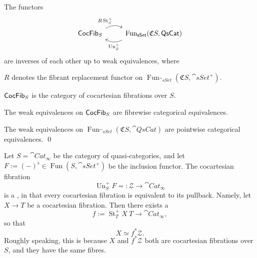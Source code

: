 \begin{corollary}
    The functors 
    \[\begin{tikzcd}
        \smash{\cat{CocFib}_{\/S}}\vphantom{1_1}\ar[r,bend left,start anchor=north east,end anchor=north west,"R\operatorname{St}_S^+"] &
        \operatorname{Fun}_{\cat{sSet}}(\mathfrak CS,\cat{QsCat})\ar[l,bend left,start anchor=south west,end anchor=south east,"\operatorname{Un}_S^+"]
    \end{tikzcd}\]
    are inverses of each other up to weak equivalences, where 
    \begin{itms}
        \item $R$ denotes the fibrant replacement functor on
        $\operatorname{Fun}_{\cat{sSet}}(\mathfrak CS,\cat{sSet}^+)$.
        \item $\mathsf{CocFib}_{\/S}$ is the category of cocartesian fibrations over $S$.
        \item The weak equivalences on $\mathsf{CocFib}_{\/S}$
        are fibrewise categorical equivalences.
        \item The weak equivalences on 
        $\operatorname{Fun}_{\cat{sSet}}(\mathfrak CS,\cat{QsCat})$
        are pointwise categorical equivalences. \qed
    \end{itms}
\end{corollary}

\begin{example}
    Let $S=\cat{Cat}_\infty$ be the category of quasi-categories,
    and let $F:=(-)^\flat\in\operatorname{Fun}(S,\cat{sSet}^+)$
    be the inclusion functor.
    The cocartesian fibration 
    \[ \operatorname{Un}_S^+F=:\mathscr Z\to\cat{Cat}_\infty \]
    is a , in that every cocartesian fibration 
    is equivalent to its pullback.
    Namely, let $X\to T$ be a cocartesian fibration.
    Then there exists a 
    \[ f:=\operatorname{St}_T^+X\:T\to\cat{Cat}_\infty, \]
    so that 
    \[ X\simeq f^*\mathscr Z. \]
    Roughly speaking, this is because
    $X$ and $f^*\mathscr Z$ both are cocartesian fibrations over $S$,
    and they have the same fibres.
    \varqed
\end{example}
